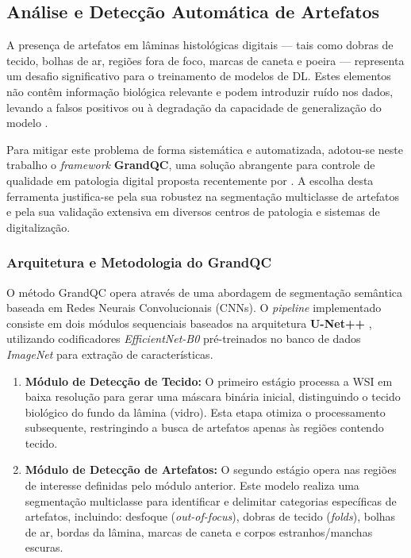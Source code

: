 \subsection{Análise e Detecção Automática de Artefatos}\label{subsec:met_analise_artefatos}

A presença de artefatos em lâminas histológicas digitais — tais como dobras de tecido, bolhas de ar, regiões fora de foco, marcas de caneta e poeira — representa um desafio significativo para o treinamento de modelos de DL. Estes elementos não contêm informação biológica relevante e podem introduzir ruído nos dados, levando a falsos positivos ou à degradação da capacidade de generalização do modelo \cite{Weng2024GrandQC}.

Para mitigar este problema de forma sistemática e automatizada, adotou-se neste trabalho o \textit{framework} \textbf{GrandQC}, uma solução abrangente para controle de qualidade em patologia digital proposta recentemente por \textcite{Weng2024GrandQC}. A escolha desta ferramenta justifica-se pela sua robustez na segmentação multiclasse de artefatos e pela sua validação extensiva em diversos centros de patologia e sistemas de digitalização.

\subsubsection{Arquitetura e Metodologia do GrandQC}

O método GrandQC opera através de uma abordagem de segmentação semântica baseada em Redes Neurais Convolucionais (CNNs). O \textit{pipeline} implementado consiste em dois módulos sequenciais baseados na arquitetura \textbf{U-Net++} \cite{Zhou2018}, utilizando codificadores \textit{EfficientNet-B0}\cite{Tan2019EfficientNet} pré-treinados no banco de dados \textit{ImageNet} \cite{Deng2009} para extração de características.

\begin{enumerate}
    \item \textbf{Módulo de Detecção de Tecido:} O primeiro estágio processa a WSI em baixa resolução para gerar uma máscara binária inicial, distinguindo o tecido biológico do fundo da lâmina (vidro). Esta etapa otimiza o processamento subsequente, restringindo a busca de artefatos apenas às regiões contendo tecido.
    
    \item \textbf{Módulo de Detecção de Artefatos:} O segundo estágio opera nas regiões de interesse definidas pelo módulo anterior. Este modelo realiza uma segmentação multiclasse para identificar e delimitar categorias específicas de artefatos, incluindo: desfoque (\textit{out-of-focus}), dobras de tecido (\textit{folds}), bolhas de ar, bordas da lâmina, marcas de caneta e corpos estranhos/manchas escuras.
\end{enumerate}

